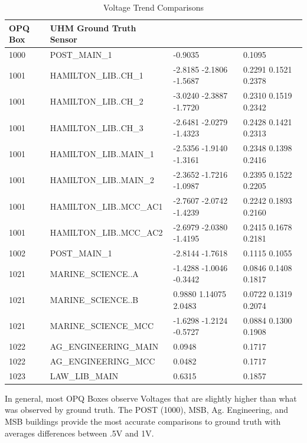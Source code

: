 \begin{table}[H]
    \centering
    \caption{Voltage Trend Comparisons}
    \begin{tabularx}{\textwidth}{lXll}
        \toprule
        \textbf{OPQ Box} & \textbf{UHM Ground Truth Sensor} & \boldmath{$\mu$} & \boldmath{$\sigma$} \\
        \midrule
        1000 & POST\_MAIN\_1 & -0.9035 & 0.1095 \\
        1001 & HAMILTON\_LIB..CH\_1 & -2.8185 -2.1806 -1.5687 & 0.2291 0.1521 0.2378 \\
        1001 & HAMILTON\_LIB..CH\_2 & -3.0240 -2.3887 -1.7720 & 0.2310 0.1519 0.2342 \\
        1001 & HAMILTON\_LIB..CH\_3 & -2.6481 -2.0279 -1.4323 & 0.2428 0.1421 0.2313 \\
        1001 & HAMILTON\_LIB..MAIN\_1 & -2.5356 -1.9140 -1.3161 & 0.2348 0.1398 0.2416 \\
        1001 & HAMILTON\_LIB..MAIN\_2 & -2.3652 -1.7216 -1.0987 & 0.2395 0.1522 0.2205 \\
        1001 & HAMILTON\_LIB..MCC\_AC1 & -2.7607 -2.0742 -1.4239 & 0.2242 0.1893 0.2160 \\
        1001 & HAMILTON\_LIB..MCC\_AC2 & -2.6979 -2.0380 -1.4195 & 0.2415 0.1678 0.2181 \\
        1002 & POST\_MAIN\_1 & -2.8144 -1.7618 & 0.1115 0.1055 \\
        1021 & MARINE\_SCIENCE..A & -1.4288 -1.0046 -0.3442 & 0.0846 0.1408 0.1817 \\
        1021 & MARINE\_SCIENCE..B & 0.9880 1.14075 2.0483 & 0.0722 0.1319 0.2074 \\
        1021 & MARINE\_SCIENCE\_MCC & -1.6298 -1.2124 -0.5727 & 0.0884 0.1300 0.1908 \\
        1022 & AG\_ENGINEERING\_MAIN & 0.0948 & 0.1717 \\
        1022 & AG\_ENGINEERING\_MCC & 0.0482 & 0.1717 \\
        1023 & LAW\_LIB\_MAIN & 0.6315 & 0.1857 \\
        \bottomrule
    \end{tabularx}
    \label{table:gt_v}
\end{table}

In general, most OPQ Boxes observe Voltages that are slightly higher than what was observed by ground truth. The POST (1000), MSB, Ag. Engineering, and MSB buildings provide the most accurate comparisons to ground truth with averages differences between .5V and 1V.


